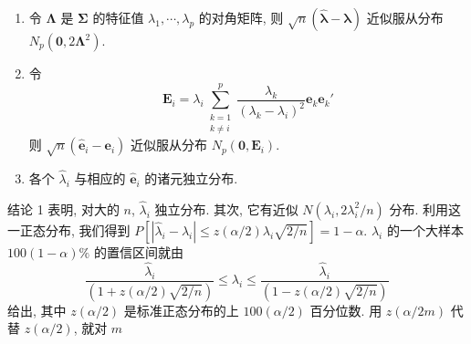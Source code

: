 \begin{enumerate}[label=\arabic*.,leftmargin=2em,itemsep=2pt]
\item 令 $\boldsymbol{\Lambda}$ 是 $\boldsymbol{\Sigma}$ 的特征值 $\lambda_1,\cdots,\lambda_p$ 的对角矩阵, 则 $\sqrt{n}(\hat{\boldsymbol{\lambda}}-\boldsymbol{\lambda})$ 近似服从分布 $N_p(\mathbf{0},2\boldsymbol{\Lambda}^2)$.
\item 令
\[
\mathbf{E}_i=\lambda_i\sum_{\substack{k=1\\ k\neq i}}^{p}\frac{\lambda_k}{(\lambda_k-\lambda_i)^2}\mathbf{e}_k\mathbf{e}_k'
\]
则 $\sqrt{n}(\hat{\mathbf{e}}_i-\mathbf{e}_i)$ 近似服从分布 $N_p(\mathbf{0},\mathbf{E}_i)$.
\item 各个 $\hat{\lambda}_i$ 与相应的 $\hat{\mathbf{e}}_i$ 的诸元独立分布.
\end{enumerate}

结论 1 表明, 对大的 $n$, $\hat{\lambda}_i$ 独立分布. 其次, 它有近似 $N(\lambda_i,2\lambda_i^2/n)$ 分布. 利用这一正态分布, 我们得到 $P[|\hat{\lambda}_i-\lambda_i|\leqslant z(\alpha/2)\lambda_i\sqrt{2/n}]=1-\alpha$. $\lambda_i$ 的一个大样本 $100(1-\alpha)\%$ 的置信区间就由
\label{eq:8-33}
\begin{equation}
\frac{\hat{\lambda}_i}{(1+z(\alpha/2)\sqrt{2/n})}\leqslant\lambda_i\leqslant\frac{\hat{\lambda}_i}{(1-z(\alpha/2)\sqrt{2/n})} \tag{8-33}
\end{equation}
给出, 其中 $z(\alpha/2)$ 是标准正态分布的上 $100(\alpha/2)$ 百分位数. 用 $z(\alpha/2m)$ 代替 $z(\alpha/2)$, 就对 $m$

